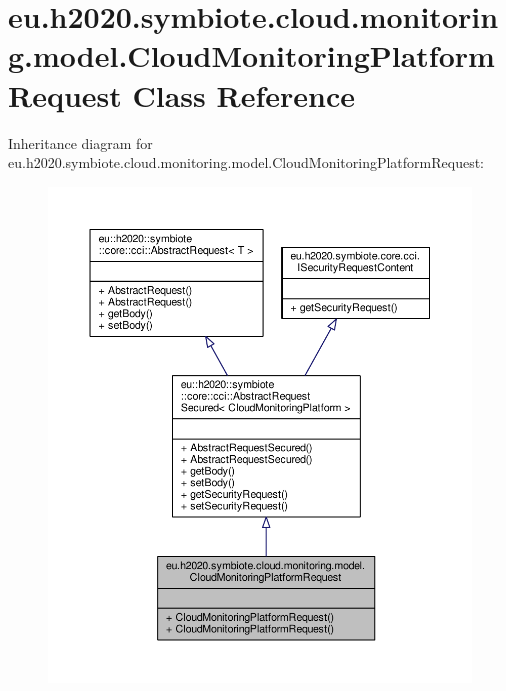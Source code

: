 \hypertarget{classeu_1_1h2020_1_1symbiote_1_1cloud_1_1monitoring_1_1model_1_1CloudMonitoringPlatformRequest}{}\section{eu.\+h2020.\+symbiote.\+cloud.\+monitoring.\+model.\+Cloud\+Monitoring\+Platform\+Request Class Reference}
\label{classeu_1_1h2020_1_1symbiote_1_1cloud_1_1monitoring_1_1model_1_1CloudMonitoringPlatformRequest}


Inheritance diagram for eu.\+h2020.\+symbiote.\+cloud.\+monitoring.\+model.\+Cloud\+Monitoring\+Platform\+Request\+:\nopagebreak
\begin{figure}[H]
\begin{center}
\leavevmode
\includegraphics[width=350pt]{classeu_1_1h2020_1_1symbiote_1_1cloud_1_1monitoring_1_1model_1_1CloudMonitoringPlatformRequest__inherit__graph}
\end{center}
\end{figure}


